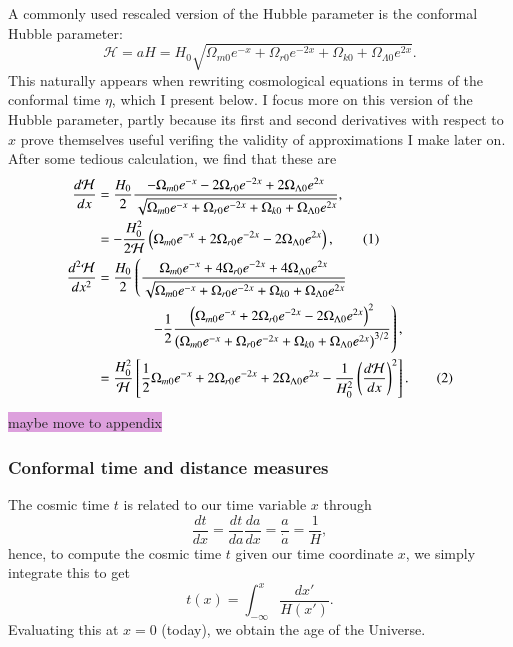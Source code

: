 \documentclass{aa}
\newcommand\numberthis{\addtocounter{equation}{1}\tag{\theequation}}
\numberwithin{equation}{section}
\numberwithin{table}{section}
\numberwithin{figure}{section}
\begin{document}
A commonly used rescaled version of the Hubble parameter is the conformal Hubble parameter:
\begin{equation}
    \mathcal{H} = aH = H_0 \sqrt{\Omega_{m0} e^{-x} + \Omega_{r0} e^{-2x} + \Omega_{k0} + \Omega_{\Lambda 0}e^{2x}}. \label{eq:Hp}
\end{equation}
This naturally appears when rewriting cosmological equations in terms of the conformal time $\eta$, which I present below. I focus more on this version of the Hubble parameter, partly because its first and second derivatives with respect to $x$ prove themselves useful verifing the validity of approximations I make later on. After some tedious calculation, we find that these are
\begin{align*}
    \frac{d\mathcal{H}}{dx} &= \frac{H_0}{2}
    \frac{-\Omega_{m0}e^{-x} - 2\Omega_{r0}e^{-2x} + 2\Omega_{\Lambda0}e^{2x}}
    {\sqrt{\Omega_{m0}e^{-x} 
    + \Omega_{r0}e^{-2x}
    + \Omega_{k0} + \Omega_{\Lambda0}e^{2x}}},
    \\
    &= -\frac{H_0^2}{2\mathcal{H}}\left(\Omega_{m0}e^{-x} + 2\Omega_{r0}e^{-2x} - 2\Omega_{\Lambda0}e^{2x}\right), \numberthis \label{eq:dHpdx}
    \\
    \frac{d^2\mathcal{H}}{dx^2} &= \frac{H_0}{2}
    \left(\frac{\Omega_{m0}e^{-x} + 4\Omega_{r0}e^{-2x} + 4\Omega_{\Lambda0}e^{2x}}{\sqrt{\Omega_{m0}e^{-x} + \Omega_{r0}e^{-2x} + \Omega_{k0} + \Omega_{\Lambda0}e^{2x}}}\right.
    \\
    &\hspace{38pt}
    \left.- \frac{1}{2}\frac{\left(\Omega_{m0}e^{-x} + 2\Omega_{r0}e^{-2x} - 2\Omega_{\Lambda0}e^{2x}\right)^2}{\left(\Omega_{m0}e^{-x} + \Omega_{r0}e^{-2x} + \Omega_{k0} + \Omega_{\Lambda0}e^{2x}\right)^{3/2}}\right),
    \\
    &= \frac{H_0^2}{\mathcal{H}}\left[\frac{1}{2}\Omega_{m0}e^{-x} + 2\Omega_{r0}e^{-2x} + 2\Omega_{\Lambda0}e^{2x}- \frac{1}{H_0^2}\left(\frac{d\mathcal{H}}{dx}\right)^2\right]. \numberthis \label{eq:ddHpddx}
\end{align*}

\colorbox{Plum}{maybe move to appendix}


\subsubsection{Conformal time and distance measures}
The cosmic time $t$ is related to our time variable $x$ through
\begin{equation}
  \frac{dt}{dx} = \frac{dt}{da}\frac{da}{dx} = \frac{a}{\dot{a}} = \frac{1}{H},
\end{equation}
hence, to compute the cosmic time $t$ given our time coordinate $x$, we simply integrate this to get 
\begin{equation}
  t(x) = \int_{-\infty}^{x} \frac{dx'}{H(x')}.
\end{equation}
Evaluating this at $x=0$ (today), we obtain the age of the Universe.
\end{document}
